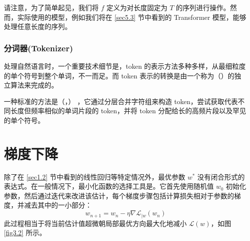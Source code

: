 请注意，为了简单起见，我们将 $f$ 定义为对长度固定为 $T$ 的序列进行操作。然而，实际使用的模型，例如我们将在 \ref{sec5.3} 节中看到的 Transformer 模型，能够处理任意长度的序列。

\subsubsection*{分词器(Tokenizer)}

处理自然语言时，一个重要技术细节是，token 的表示方法多种多样，从最细粒度的单个符号到整个单词，不一而足。而 token 表示的转换是由一个称为（）的独立算法来完成的。

一种标准的方法是（，） \citep{srivastava14a}，它通过分层合并字符组来构造 token，尝试获取代表不同长度但频率相似的单词片段的 token，并将 token 分配给长的高频片段以及罕见的单个符号。

\section{梯度下降}\label{sec3.3}

除了在 \ref{sec1.2} 节中看到的线性回归等特定情况外，最优参数 $w^*$ 没有闭合形式的表达式。在一般情况下，最小化函数的选择工具是。它首先使用随机值 $w_0$ 初始化参数，然后通过迭代来改进该估计，每个梯度步骤包括计算损失相对于参数的梯度，并减去其中的一小部分：
\begin{equation}
    w_{n+1} = w_n - \eta \nabla \mathcal{L}_{\mid w}(w_n)\label{eq3.1}
\end{equation}
此过程相当于将当前估计值超微朝局部最优方向最大化地减小 $\mathcal{L}(w)$，如图 \ref{fig3.2} 所示。

